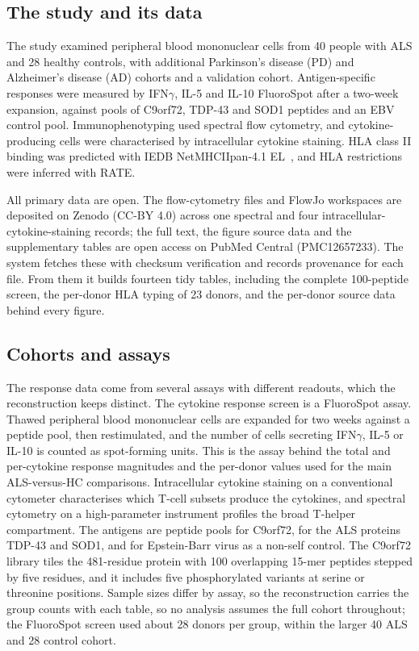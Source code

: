 \documentclass[11pt]{article}
\begin{document}
\subsection{The study and its data}
The study examined peripheral blood mononuclear cells from 40 people with ALS and 28 healthy
controls, with additional Parkinson's disease (PD) and Alzheimer's disease (AD) cohorts and a
validation cohort. Antigen-specific responses were measured by IFN$\gamma$, IL-5 and IL-10
FluoroSpot after a two-week expansion, against pools of C9orf72, TDP-43 and SOD1 peptides and an
EBV control pool. Immunophenotyping used spectral flow cytometry, and cytokine-producing cells
were characterised by intracellular cytokine staining. HLA class II binding was predicted with
IEDB NetMHCIIpan-4.1 EL~\citep{nielsen2008,jensen2018}, and HLA restrictions were inferred with RATE.

All primary data are open. The flow-cytometry files and FlowJo workspaces are deposited on Zenodo
(CC-BY 4.0) across one spectral and four intracellular-cytokine-staining records; the full text,
the figure source data and the supplementary tables are open access on PubMed Central (PMC12657233).
The system fetches these with checksum verification and records provenance for each file. From
them it builds fourteen tidy tables, including the complete 100-peptide screen, the per-donor HLA
typing of 23 donors, and the per-donor source data behind every figure.

\subsection{Cohorts and assays}
The response data come from several assays with different readouts, which the reconstruction keeps
distinct. The cytokine response screen is a FluoroSpot assay. Thawed peripheral blood mononuclear
cells are expanded for two weeks against a peptide pool, then restimulated, and the number of cells
secreting IFN$\gamma$, IL-5 or IL-10 is counted as spot-forming units. This is the assay behind the
total and per-cytokine response magnitudes and the per-donor values used for the main ALS-versus-HC
comparisons. Intracellular cytokine staining on a conventional cytometer characterises which T-cell
subsets produce the cytokines, and spectral cytometry on a high-parameter instrument profiles the
broad T-helper compartment. The antigens are peptide pools for C9orf72, for the ALS proteins TDP-43
and SOD1, and for Epstein-Barr virus as a non-self control. The C9orf72 library tiles the 481-residue
protein with 100 overlapping 15-mer peptides stepped by five residues, and it includes five
phosphorylated variants at serine or threonine positions. Sample sizes differ by assay, so the
reconstruction carries the group counts with each table, so no analysis assumes the full cohort
throughout; the FluoroSpot screen used about 28 donors per group, within the larger 40 ALS and 28
control cohort.
\end{document}
